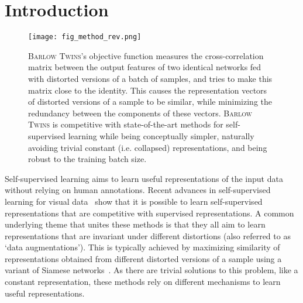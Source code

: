 \documentclass{article}
\newcommand{\AlgoName}{\textsc{Barlow Twins}}
\begin{document}
\section{Introduction}


\begin{figure}[ht]
\vskip 0.2in
\begin{center}
\centerline{\texttt{[image: fig\_method\_rev.png]}}
\caption{\AlgoName{}'s objective function measures the cross-correlation matrix between the output features of two identical networks fed with distorted versions of a batch of samples, and tries to make this matrix close to the identity. This causes the representation vectors of distorted versions of a sample to be similar, while minimizing the redundancy between the components of these vectors. \AlgoName{} is competitive with state-of-the-art methods for self-supervised learning while being conceptually simpler, naturally avoiding trivial constant (i.e. collapsed) representations, and being robust to the training batch size.}
\label{fig:fig_method}
\end{center}
\vskip -0.2in
\end{figure}

Self-supervised learning aims to learn useful representations of the input data without relying on human annotations. 
Recent advances in self-supervised learning for visual data~\cite{caron2020swav,grill2020bootstrap,chen2020simple,he2019momentum,misra2019self} show that it is possible to learn self-supervised representations that are competitive with supervised representations. 
A common underlying theme that unites these methods is that they all aim to learn representations that are invariant under different distortions (also referred to as `data augmentations'). 
This is typically achieved by maximizing similarity of representations obtained from different distorted versions of a sample using a variant of Siamese networks~\cite{hadsell2006dimensionality}.
As there are trivial solutions to this problem, like a constant representation, these methods rely on different mechanisms to learn useful representations.
\end{document}
